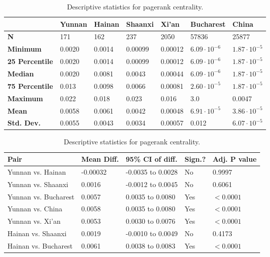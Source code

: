 \begin{table}[htbp]
	\begin{mdframed}
		\begin{tabular*}{\linewidth}{l|llllll}
			\hline
			\textbf{ } & \textbf{Yunnan} & \textbf{Hainan} & \textbf{Shaanxi} & \textbf{Xi'an} & \textbf{Bucharest} & \textbf{China}\\
			\hline
			\textbf{N} & 171 & 162 & 237 & 2050 & 57836 & 25877\\
			\textbf{Minimum} & 0.0020 & 0.0014 & 0.00099 & 0.00012 & $6.09\cdot 10^{-6}$ & $1.87\cdot 10^{-5}$\\
			\textbf{25 Percentile} & 0.0020 & 0.0014 & 0.00099 & 0.00012 & $6.09\cdot 10^{-6}$ & $1.87\cdot 10^{-5}$\\
			\textbf{Median} & 0.0020 & 0.0081 & 0.0043 & 0.00044 & $6.09\cdot 10^{-6}$ & $1.87\cdot 10^{-5}$\\
			\textbf{75 Percentile} & 0.013 & 0.0098 & 0.0066 & 0.00081 & $2.60\cdot 10^{-5}$ & $1.87\cdot 10^{-5}$\\
			\textbf{Maximum} & 0.022 & 0.018 & 0.023 & 0.016 & 3.0 & 0.0047\\
			\textbf{Mean} & 0.0058 & 0.0061 & 0.0042 & 0.00048 & $6.91\cdot 10^{-5}$ & $3.86\cdot 10^{-5}$\\
			\textbf{Std. Dev.} & 0.0055 & 0.0043 & 0.0034 & 0.00057 & 0.012 & $6.07\cdot 10^{-5}$\\
			\hline
		\end{tabular*}
		\caption{Descriptive statistics for pagerank centrality.}
		\label{tab:pagerank_centrality_desc}
		\vskip 10pt
		\small
		\begin{tabular*}{\linewidth}{l|llll}
			\hline
			\textbf{Pair} & \textbf{Mean Diff.} & \textbf{95\% CI of diff.} & \textbf{Sign.?} & \textbf{Adj. P value}\\
			\hline
			Yunnan vs. Hainan & -0.00032 & -0.0035 to 0.0028 & No & 0.9997\\
			Yunnan vs. Shaanxi & 0.0016 & -0.0012 to 0.0045 & No & 0.6061\\
			Yunnan vs. Bucharest & 0.0057 & 0.0035 to 0.0080 & Yes & $<0.0001$\\
			Yunnan vs. China & 0.0058 & 0.0035 to 0.0080 & Yes & $<0.0001$\\
			Yunnan vs. Xi'an & 0.0053 & 0.0030 to 0.0076 & Yes & $<0.0001$\\
			Hainan vs. Shaanxi & 0.0019 & -0.0010 to 0.0049 & No & 0.4173\\
			Hainan vs. Bucharest & 0.0061 & 0.0038 to 0.0083 & Yes & $<0.0001$\\

\end{tabular*}
\end{mdframed}
\end{table}
